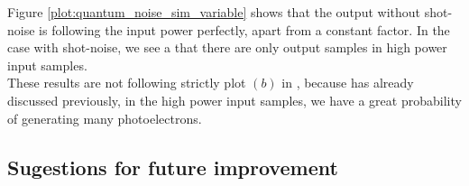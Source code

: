%
Figure \ref{plot:quantum_noise_sim_variable} shows that the output without shot-noise is following the input power perfectly, apart from a constant factor. In the case with shot-noise, we see a that there are only output samples in high power input samples.\\
These results are not following strictly plot $(b)$ in \cite{saleh1991}, because has already discussed previously, in the high power input samples, we have a great probability of generating many photoelectrons.
%
\subsection*{Sugestions for future improvement}

%
